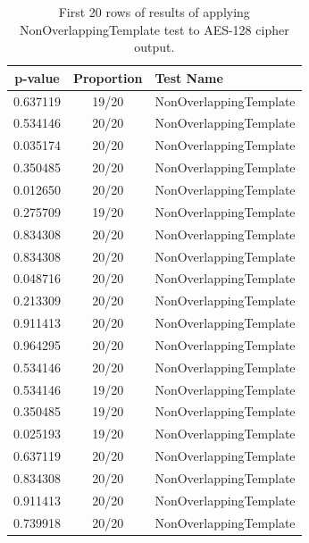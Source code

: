 \documentclass[conference]{IEEEtran}
\begin{document}
\begin{center}
\begin{table}
\renewcommand{\arraystretch}{1.2}
\centering
\begin{tabular}{|c|c|l|}
\hline
\textbf{p-value} & \textbf{Proportion} & \textbf{Test Name} \\ \hline
0.637119         & 19/20               & NonOverlappingTemplate    \\ \hline
0.534146         & 20/20               & NonOverlappingTemplate    \\ \hline
0.035174         & 20/20               & NonOverlappingTemplate    \\ \hline
0.350485         & 20/20               & NonOverlappingTemplate    \\ \hline
0.012650         & 20/20               & NonOverlappingTemplate    \\ \hline
0.275709         & 19/20               & NonOverlappingTemplate    \\ \hline
0.834308         & 20/20               & NonOverlappingTemplate    \\ \hline
0.834308         & 20/20               & NonOverlappingTemplate    \\ \hline
0.048716         & 20/20               & NonOverlappingTemplate    \\ \hline
0.213309         & 20/20               & NonOverlappingTemplate    \\ \hline
0.911413         & 20/20               & NonOverlappingTemplate    \\ \hline
0.964295         & 20/20               & NonOverlappingTemplate    \\ \hline
0.534146         & 20/20               & NonOverlappingTemplate    \\ \hline
0.534146         & 19/20               & NonOverlappingTemplate    \\ \hline
0.350485         & 19/20               & NonOverlappingTemplate    \\ \hline
0.025193         & 19/20               & NonOverlappingTemplate    \\ \hline
0.637119         & 20/20               & NonOverlappingTemplate    \\ \hline
0.834308         & 20/20               & NonOverlappingTemplate    \\ \hline
0.911413         & 20/20               & NonOverlappingTemplate    \\ \hline
0.739918         & 20/20               & NonOverlappingTemplate    \\ \hline
\end{tabular}
\caption{First 20 rows of results of applying NonOverlappingTemplate test to AES-128 cipher output.}
\label{nistresults1}
\end{table}
\end{center}
\end{document}
